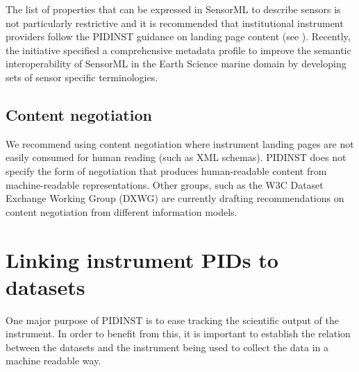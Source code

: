\documentclass[a4paper,10pt,english]{sphinxmanual}
\begin{document}
The list of properties that can be expressed in SensorML to describe
sensors is not particularly restrictive and it is recommended that
institutional instrument providers follow the PIDINST guidance on
landing page content (see {\hyperref[\detokenize{white-paper/landing-page-content:landing-page-content}]{}}).  Recently, the
 initiative specified a comprehensive metadata
profile to improve the semantic interoperability of SensorML in the
Earth Science marine domain by developing sets of sensor specific
terminologies.


\subsection{Content negotiation}
\label{\detokenize{white-paper/landing-page-encoding:content-negotiation}}
We recommend using content negotiation where instrument landing pages
are not easily consumed for human reading (such as XML schemas). PIDINST
does not specify the form of negotiation that produces human-readable
content from machine-readable representations. Other groups, such as the
W3C Dataset Exchange Working Group (DXWG) are currently drafting
recommendations on content negotiation from different information
models.%
\begin{footnote}[2]\sphinxAtStartFootnote
{}
%
\end{footnote}


\section{Linking instrument PIDs to datasets}
\label{\detokenize{white-paper/linking-datasets:linking-instrument-pids-to-datasets}}\label{\detokenize{white-paper/linking-datasets::doc}}
One major purpose of PIDINST is to ease tracking the scientific output
of the instrument.  In order to benefit from this, it is important to
establish the relation between the datasets and the instrument being
used to collect the data in a machine readable way.
\end{document}
